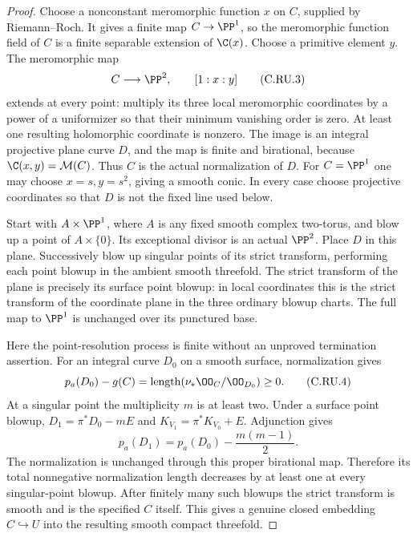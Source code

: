 \begin{proof}
Choose a nonconstant meromorphic function $x$ on $C$, supplied by
Riemann--Roch. It gives a finite map $C\to\PP^1$, so the meromorphic
function field of $C$ is a finite separable extension of $\C(x)$.
Choose a primitive element $y$. The meromorphic map
\[
                    C\longrightarrow\PP^2,\qquad [1:x:y]
\tag{C.RU.3}\label{cdp:eq:C.RU.3}
\]
extends at every point: multiply its three local meromorphic coordinates
by a power of a uniformizer so that their minimum vanishing order is zero.
At least one resulting holomorphic coordinate is nonzero. The image is an
integral projective plane curve $D$, and the map is finite and birational,
because $\C(x,y)=\mathcal M(C)$. Thus $C$ is the actual normalization of
$D$. For $C=\PP^1$ one may choose $x=s,y=s^2$, giving a smooth conic.
In every case choose projective coordinates so that $D$ is not the fixed
line used below.

Start with $A\times\PP^1$, where $A$ is any fixed smooth complex two-torus,
and blow up a point of $A\times\{0\}$. Its exceptional divisor is an
actual $\PP^2$. Place $D$ in this plane. Successively blow up singular
points of its strict transform, performing each point blowup in the
ambient smooth threefold. The strict transform of the plane is precisely
its surface point blowup: in local coordinates this is the strict
transform of the coordinate plane in the three ordinary blowup charts.
The full map to $\PP^1$ is unchanged over its punctured base.

Here the point-resolution process is finite without an unproved
termination assertion. For an integral curve $D_0$ on a smooth surface,
normalization gives
\[
  p_a(D_0)-g(C)=\operatorname{length}
                (\nu_*\OO_C/\OO_{D_0})\ge0.
\tag{C.RU.4}\label{cdp:eq:C.RU.4}
\]
At a singular point the multiplicity $m$ is at least two. Under a surface
point blowup, $D_1=\pi^*D_0-mE$ and
$K_{V_1}=\pi^*K_{V_0}+E$. Adjunction gives
\[
                        p_a(D_1)=p_a(D_0)-\frac{m(m-1)}2.
\tag{C.RU.5}\label{cdp:eq:C.RU.5}
\]
The normalization is unchanged through this proper birational map.
Therefore its total nonnegative normalization length decreases by at
least one at every singular-point blowup. After finitely many such
blowups the strict transform is smooth and is the specified $C$ itself.
This gives a genuine closed embedding $C\hookrightarrow U$ into the
resulting smooth compact threefold.


\end{proof}
